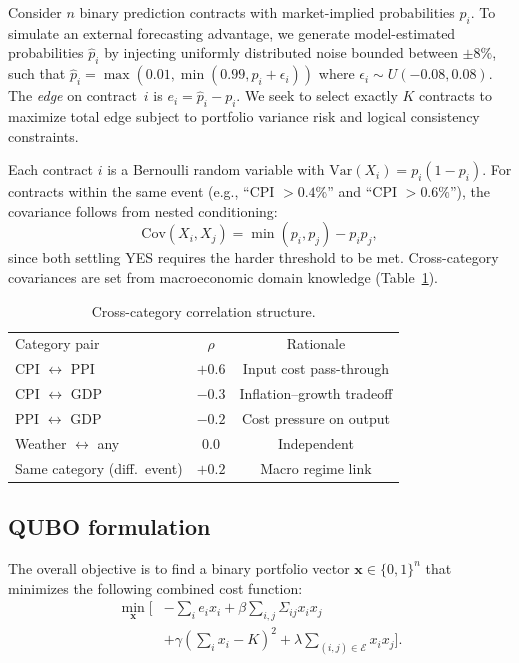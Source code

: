\documentclass[aps, reprint, prl, twocolumn, superscriptaddress,amsmath,amssymb,noeprint]{revtex4-2}
\begin{document}
Consider $n$ binary prediction contracts with market-implied probabilities
$p_i$. To simulate an external forecasting advantage, we generate model-estimated probabilities $\hat{p}_i$ by injecting uniformly distributed noise bounded between $\pm 8\%$, such that $\hat{p}_i = \max(0.01, \min(0.99, p_i + \epsilon_i))$ where $\epsilon_i \sim U(-0.08, 0.08)$. The \emph{edge} on
contract~$i$ is $e_i = \hat{p}_i - p_i$.  We seek to select exactly $K$
contracts to maximize total edge subject to portfolio variance risk and
logical consistency constraints.

Each contract $i$ is a Bernoulli random variable with
$\text{Var}(X_i) = p_i(1-p_i)$.  For contracts within the same event
(e.g., ``CPI $> 0.4\%$'' and ``CPI $> 0.6\%$''), the covariance follows
from nested conditioning:
\begin{equation}
  \text{Cov}(X_i, X_j) = \min(p_i, p_j) - p_i p_j,
  \label{eq:nested_cov}
\end{equation}
since both settling YES requires the harder threshold to be met.
Cross-category covariances are set from macroeconomic domain knowledge
(Table~\ref{tab:correlations}).

\begin{table}[b]
\caption{\label{tab:correlations}Cross-category correlation structure.}
\begin{ruledtabular}
\begin{tabular}{lcc}
Category pair & $\rho$ & Rationale \\
\colrule
CPI $\leftrightarrow$ PPI  & $+0.6$ & Input cost pass-through \\
CPI $\leftrightarrow$ GDP  & $-0.3$ & Inflation--growth tradeoff \\
PPI $\leftrightarrow$ GDP  & $-0.2$ & Cost pressure on output \\
Weather $\leftrightarrow$ any & $0.0$ & Independent \\
Same category (diff.\ event) & $+0.2$ & Macro regime link \\
\end{tabular}
\end{ruledtabular}
\end{table}

\subsection{QUBO formulation}

The overall objective is to find a binary portfolio vector $\mathbf{x} \in \{0,1\}^n$ that minimizes the following combined cost function:
\begin{equation}
\begin{split}
  \min_{\mathbf{x}} \bigg[ &-\sum_{i} e_i x_i + \beta \sum_{i,j} \Sigma_{ij} x_i x_j \\
  &+ \gamma \left( \sum_i x_i - K \right)^2 + \lambda \sum_{(i,j) \in \mathcal{E}} x_i x_j \bigg].
\end{split}
  \label{eq:objective}
\end{equation}
\end{document}
